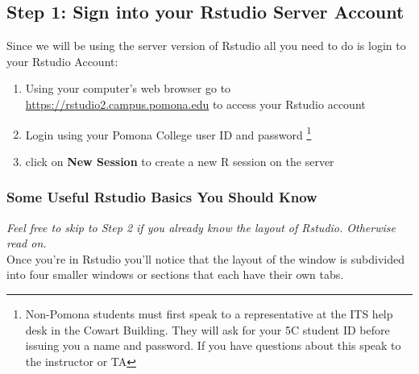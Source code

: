 \documentclass{article}\usepackage[]{graphicx}\usepackage[]{color}
\begin{document}
  \subsection*{Step 1: Sign into your Rstudio Server Account}
Since we will be using the server version of Rstudio all you need to do is login to your Rstudio Account:
    \begin{enumerate}
    \item Using your computer's web browser go to \url{https://rstudio2.campus.pomona.edu} to access your Rstudio account
    \item Login using your Pomona College user ID and password \footnote{Non-Pomona students must first speak to a representative at the ITS help desk in the Cowart Building. They will ask for your 5C student ID before issuing you a name and password. If you have questions about this speak to the instructor or TA}
    \item click on \textbf{New Session} to create a new R session on the server
    \end{enumerate}
\pagebreak

  \subsubsection*{Some Useful Rstudio Basics You Should Know}
  \emph{Feel free to skip to Step 2 if you already know the layout of Rstudio. Otherwise read on.}\\
  Once you're in Rstudio you'll notice that the layout of the window is subdivided into four smaller windows or sections that each have their own tabs. \vspace{5mm}
  
\end{document}
